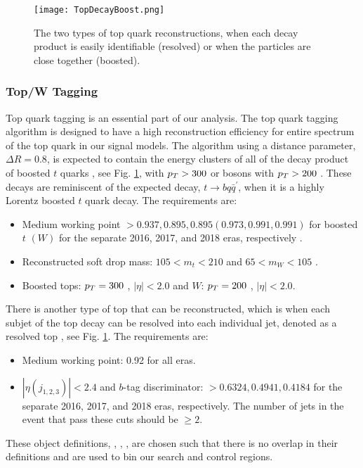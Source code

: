 \begin{figure}
 	\centering
	\texttt{[image: TopDecayBoost.png]}
 	\caption[Top Decays]{The two types of top quark reconstructions, when each decay product is easily identifiable (resolved) or when the particles are close together (boosted).}
 	\label{TopDecays} 
\end{figure}

\subsubsection{Top/W Tagging}\label{TopTagging}
Top quark tagging is an essential part of our analysis. The top quark tagging algorithm is designed to have a high reconstruction efficiency for entire \pt{} spectrum of the top quark in our signal models. The \antikt{} algorithm using a distance parameter, $\Delta R=0.8$, is expected to contain the energy clusters of all of the decay product of boosted $t$ quarks \cite{noauthor_top_nodate, noauthor_identification_nodate-1}, see Fig. \ref{TopDecays}, with $p_{T}>300$ \GeV{} or \W{} bosons with $p_{T}>200$ \GeV. These decays are reminiscent of the expected decay, $t\rightarrow bq\bar{q}^\prime$, when it is a highly Lorentz boosted $t$ quark decay. The requirements are:
\begin{itemize}
	\item Medium working point $>0.937, 0.895, 0.895 (0.973, 0.991, 0.991)$ for boosted $t$ $(W)$ for the separate 2016, 2017, and 2018 eras, respectively \cite{ganin_unsupervised_2015}.
	\item Reconstructed soft drop\cite{larkoski_soft_2014, dasgupta_towards_2013} mass: $105<m_t<210$ \GeV{} and $65<m_W<105$ \GeV.
	\item Boosted tops: $p_{T}=300$ \GeV, $|\eta|<2.0$ and $W$: $p_{T}=200$ \GeV, $|\eta|<2.0$.
\end{itemize}

There is another type of top that can be reconstructed, which is when each subjet of the top decay can be resolved into each individual jet, denoted as a resolved top \cite{ganin_unsupervised_2015}, see Fig. \ref{TopDecays}. The requirements are:
\begin{itemize}
	\item Medium working point: 0.92 for all eras.
	\item $|\eta(j_{1,2,3})|<2.4$ and $b$-tag discriminator: $>0.6324, 0.4941, 0.4184$ for the separate 2016, 2017, and 2018 eras, respectively. The number of jets in the event that pass these cuts should be $\geq2$.
\end{itemize}
These object definitions, \nt, \nw, \nrt, are chosen such that there is no overlap in their definitions and are used to bin our search and control regions. 

